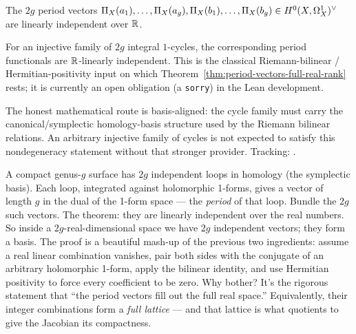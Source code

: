 \begin{theorem}
\label{thm:period-vectors-full-real-rank}
The \(2g\) period vectors
\(\Pi_X(a_1),\dots,\Pi_X(a_g),\Pi_X(b_1),\dots,\Pi_X(b_g)
   \in H^{0}(X,\Omega^{1}_{X})^{\vee}\)
are linearly independent over \(\mathbb{R}\).
\end{theorem}

\begin{lemma}
\label{lem:riemann-classical-real-li-input}
For an injective family of \(2g\) integral \(1\)-cycles, the corresponding
period functionals are \(\mathbb{R}\)-linearly independent. This is the classical
Riemann-bilinear / Hermitian-positivity input on which
Theorem~\ref{thm:period-vectors-full-real-rank} rests; it is currently an open
obligation (a \lstinline{sorry}) in the Lean development.

The honest mathematical route is basis-aligned: the cycle family must carry the
canonical/symplectic homology-basis structure used by the Riemann bilinear
relations. An arbitrary injective family of cycles is not expected to satisfy
this nondegeneracy statement without that stronger provider.
Tracking: .
\end{lemma}

\begin{layman}
A compact genus-\(g\) surface has \(2g\) independent loops in homology
(the symplectic basis). Each loop, integrated against holomorphic
1-forms, gives a vector of length \(g\) in the dual of the 1-form
space --- the \emph{period} of that loop. Bundle the \(2g\) such
vectors. The theorem: they are linearly independent over the real
numbers. So inside a \(2g\)-real-dimensional space we have \(2g\)
independent vectors; they form a basis. The proof is a beautiful
mash-up of the previous two ingredients: assume a real linear
combination vanishes, pair both sides with the conjugate of an arbitrary
holomorphic 1-form, apply the bilinear identity, and use Hermitian
positivity to force every coefficient to be zero. Why bother? It's the
rigorous statement that ``the period vectors fill out the full real
space.'' Equivalently, their integer combinations form a \emph{full
lattice} --- and that lattice is what quotients to give the Jacobian its
compactness.
\end{layman}

